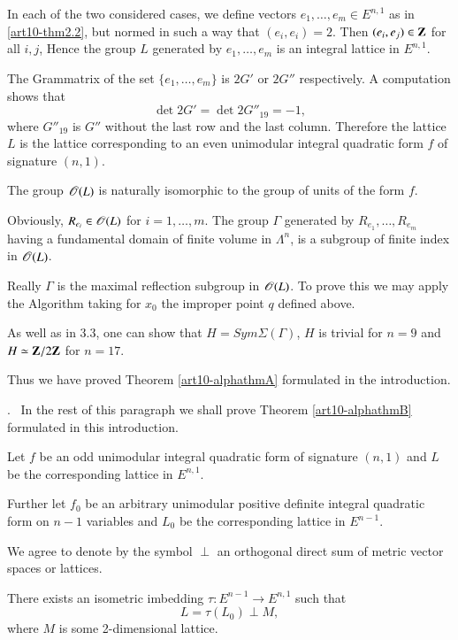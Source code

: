 In each of the two considered cases, we define vectors $e_1, \ldots, e_m \in E^{n,1}$ as in \ref{art10-thm2.2}, but normed in such a way that $(e_i, e_i) =2$. Then $(e_i, e_j) \in \mathbf{Z}$ for all $i, j$, Hence the group $L$ generated by $e_1, \ldots , e_m$ is an integral lattice in $E^{n,1}$.

The Gram\pageoriginale  matrix of the set $\{e_1, \ldots, e_m\}$ is $2G'$ or $2G''$ respectively. A computation shows that
$$
\det 2 G' = \det 2 G''_{19} = - 1,
$$
where $G''_{19}$ is $G''$ without the last row and the last column. Therefore the lattice $L$ is the lattice corresponding to an even unimodular integral quadratic form $f$ of signature $(n,1)$.

The group $\mathscr{O}(L)$ is naturally isomorphic to the group of units of the form $f$.

Obviously, $R_{e_i} \in \mathscr{O} (L)$ for $i = 1, \ldots, m$. The group $\Gamma$ generated by $R_{e_1}, \ldots, R_{e_m}$ having a fundamental domain of finite volume in $\Lambda^n$, is a subgroup of finite index in $\mathscr{O}(L)$.

Really $\Gamma$ is the maximal reflection subgroup in $\mathscr{O} (L)$. To prove this we may apply the Algorithm taking for $x_0$ the improper point $q$ defined above.

As well as in 3.3, one can show that $H = Sym \Sigma (\Gamma)$, \ie $H$ is trivial for $n =9$ and $H \simeq \mathbf{Z} / 2 \mathbf{Z}$ for $n = 17$.

Thus we have proved Theorem \ref{art10-alphathmA} formulated in the introduction. 

.~ In the rest of this paragraph we shall prove Theorem \ref{art10-alphathmB} formulated in this introduction.

Let $f$ be an odd unimodular integral quadratic form of signature $(n,1)$ and $L$ be the corresponding lattice in $E^{n,1}$.

Further let $f_0$ be an arbitrary unimodular positive definite integral quadratic form on $n-1$ variables and $L_0$ be the corresponding lattice in $E^{n-1}$.

We agree to denote by the symbol $\perp$ an orthogonal direct sum of metric vector spaces or lattices.

\setcounter{lemma}{4}
\begin{lemma}\label{art10-lem3.5}
There exists an isometric imbedding $\tau : E^{n-1} \to E^{n,1}$ such that 
$$
L = \tau (L_0) \perp M,
$$
where $M$ is some 2-dimensional lattice.
\end{lemma}

